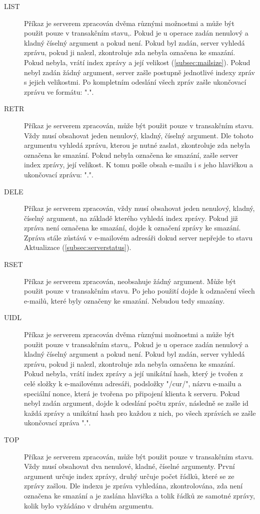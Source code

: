 \documentclass[11pt,a4paper]{report}
\begin{document}
\begin{description}
        \item[LIST] Příkaz je serverem zpracován dvěma různými možnostmi a může být použit pouze v transakčním stavu,. Pokud je u operace zadán nenulový a kladný číselný argument a pokud není. Pokud byl zadán, server vyhledá zprávu, pokud ji nalezl, zkontroluje zda nebyla označena ke smazání. Pokud nebyla, vrátí index \cite{index} zprávy a její velikost (\ref{subsec:mailsize}). Pokud nebyl zadán žádný argument, server zašle postupně jednotlivé indexy zpráv s jejich velikostmi. Po kompletním odeslání všech zpráv zašle ukončovací zprávu ve formátu: ".".
        \item[RETR] Příkaz je serverem zpracován, může být použit pouze v transakčním stavu. Vždy musí obsahovat jeden nenulový, kladný, číselný argument. Dle tohoto argumentu vyhledá zprávu, kterou je nutné zaslat, zkontroluje zda nebyla označena ke smazání. Pokud nebyla označena ke smazání, zašle server index zprávy, její velikost. K tomu pošle obsah e-mailu i s jeho hlavičkou a ukončovací zprávu: ".".
        \item[DELE] Příkaz je serverem zpracován, vždy musí obsahovat jeden nenulový, kladný, číselný argument, na základě kterého vyhledá index zprávy. Pokud již zpráva není označena ke smazání, dojde k označení zprávy ke smazání. Zpráva stále zůstává v e-mailovém adresáři dokud server nepřejde to stavu Aktualizace (\ref{subsec:serverstatus}).
        \item[RSET] Příkaz je serverem zpracován, neobsahuje žádný argument. Může být použit pouze v transakčním stavu. Po jeho použití dojde k odznačení všech e-mailů, které byly označeny ke smazání. Nebudou tedy smazány.
        \item[UIDL] Příkaz je serverem zpracován dvěma různými možnostmi a může být použit pouze v transakčním stavu,. Pokud je u operace zadán nenulový a kladný číselný argument a pokud není. Pokud byl zadán, server vyhledá zprávu, pokud ji nalezl, zkontroluje zda nebyla označena ke smazání. Pokud nebyla, vrátí index \cite{index} zprávy a její unikátní hash, který je tvořen z celé složky k e-mailovému adresáři, podsložky "/cur/", názvu e-mailu a speciální nonce, která je tvořena po připojení klienta k serveru. Pokud nebyl zadán argument, dojde k odeslání počtu zpráv, následně se zašle id každá zprávy a unikátní hash pro každou z nich, po všech zprávách se zašle ukončovací zpráva ".".
        \item[TOP] Příkaz je serverem zpracován, může být použit pouze v transakčním stavu. Vždy musí obsahovat dva nenulové, kladné, číselné argumenty. První argument určuje index zprávy, druhý určuje počet řádků, které se ze zprávy zašlou. Dle indexu je zpráva vyhledána, zkontrolována, zda není označena ke smazání a je zaslána hlavička a tolik řádků ze samotné zprávy, kolik bylo vyžádáno v druhém argumentu.
    \end{description}
\end{document}
